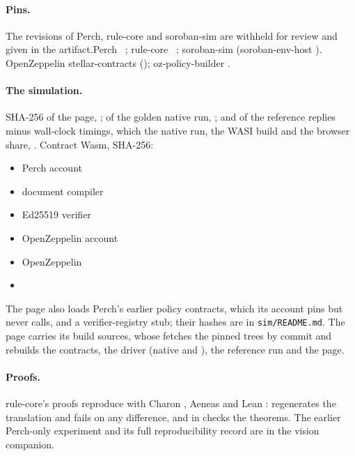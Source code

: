 \paragraph{Pins.} \ifdefined\anonymous The revisions of Perch, rule-core and
soroban-sim are withheld for review and given in the artifact.\else Perch
~; rule-core
~; soroban-sim
 (soroban-env-host
).\fi{} OpenZeppelin stellar-contracts
 (); oz-policy-builder
.

\paragraph{The simulation.} SHA-256 of the page, ; of
the golden native run, ; and of the reference
replies minus wall-clock timings, which the native run, the WASI build and the
browser share, . Contract Wasm, SHA-256:
{\footnotesize
\begin{itemize}[nosep,leftmargin=*]
\item Perch account 
\item document compiler 
\item Ed25519 verifier 
\item OpenZeppelin account 
\item OpenZeppelin  
\item {} 
\end{itemize}}
\noindent The page also loads Perch's earlier policy contracts, which its
account pins but never calls, and a verifier-registry stub; their hashes are in
\nolinkurl{sim/README.md}. The page carries its build sources, whose
 fetches the pinned trees by commit and rebuilds the contracts,
the driver (native and ), the reference run and the page.

\paragraph{Proofs.} rule-core's proofs reproduce with Charon
, Aeneas  and Lean :
 regenerates the translation and fails on any
difference, and  in  checks the theorems. The
earlier Perch-only experiment and its full reproducibility record are in the
vision companion.


